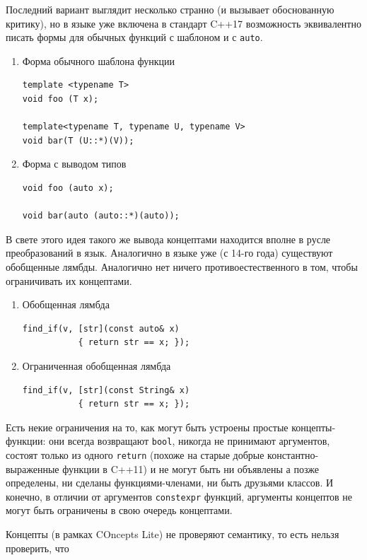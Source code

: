 \documentclass[a4paper,12pt,oneside]{article}
\begin{document}
Последний вариант выглядит несколько странно (и вызывает обоснованную критику), но в языке уже включена в стандарт C++17 возможность эквивалентно писать формы для обычных функций с шаблоном и с \lstinline!auto!.

\begin{enumerate}
\item Форма обычного шаблона функции 
\begin{lstlisting}
template <typename T> 
void foo (T x);

template<typename T, typename U, typename V> 
void bar(T (U::*)(V));
\end{lstlisting}
\item Форма с выводом типов
\begin{lstlisting}
void foo (auto x);

void bar(auto (auto::*)(auto));
\end{lstlisting}

\end{enumerate}

В свете этого идея такого же вывода концептами находится вполне в русле преобразований в язык. Аналогично в языке уже (с 14-го года) существуют обобщенные лямбды. Аналогично нет ничего противоестественного в том, чтобы ограничивать их концептами.

\begin{enumerate}
\item Обобщенная лямбда
\begin{lstlisting}
find_if(v, [str](const auto& x) 
           { return str == x; });
\end{lstlisting}
\item Ограниченная обобщенная лямбда
\begin{lstlisting}
find_if(v, [str](const String& x)
           { return str == x; });
\end{lstlisting}
\end{enumerate}

Есть некие ограничения на то, как могут быть устроены простые концепты-функции: они всегда возвращают \lstinline!bool!, никогда не принимают аргументов, состоят только из одного \lstinline!return! (похоже на старые добрые константно-выраженные функции в C++11) и не могут быть ни объявлены а позже определены, ни сделаны функциями-членами, ни быть друзьями классов. И конечно, в отличии от аргументов \lstinline!constexpr! функций, аргументы концептов не могут быть ограничены в свою очередь концептами.

Концепты (в рамках COncepts Lite) не проверяют семантику, то есть нельзя проверить, что
\end{document}
